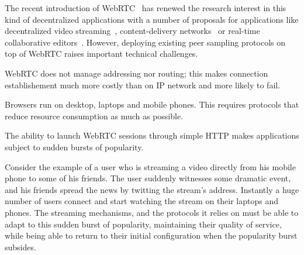 The recent introduction of WebRTC~\cite{webrtc} has renewed the
research interest in this kind of decentralized applications with a
number of proposals for applications like decentralized video
streaming~\cite{hivejs,smoothcache2}, content-delivery
networks~\cite{Zhang:2013:MBC:2465351.2465379} or real-time
collaborative editors~\cite{nedelec2016crate}. However, deploying
existing peer sampling protocols on top of WebRTC raises important
technical challenges. 
\begin{inparaenum}[(1)]
\item WebRTC does not manage addressing nor routing; this makes
  connection establishement much more costly than on IP network and
  more likely to fail. 
\item Browsers run on desktop, laptops and mobile phones. This
  requires protocols that reduce resource consumption as much as
  possible.
\item The ability to launch WebRTC sessions through simple HTTP makes
  applications subject to sudden bursts of popularity.  %
\end{inparaenum}
Consider the example of a user who is streaming a video directly from
his mobile phone to some of his friends. The user suddenly witnesses
some dramatic event, and his friends spread the news by twitting the
stream's address. Instantly a huge number of users connect and start
watching the stream on their laptops and phones. The streaming
mechanisms, and the protocols it relies on must be able to adapt to
this sudden burst of popularity, maintaining their quality of service,
while being able to return to their initial configuration when the
popularity burst subsides. 


